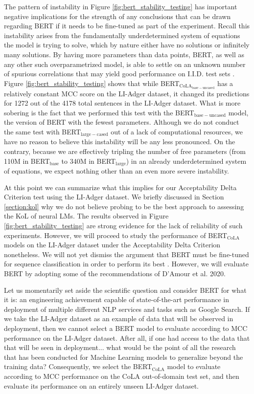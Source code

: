 The pattern of instability in Figure \ref{fig:bert_stability_testing} has important negative implications for the strength of any conclusions that can be drawn regarding BERT if it needs to be fine-tuned as part of the experiment.  Recall this instability arises from the fundamentally underdetermined system of equations the model is trying to solve, which by nature either have no solutions or infinitely many solutions.  By having more parameters than data points, BERT, as well as any other such overparametrized model, is able to settle on an unknown number of spurious correlations that may yield good performance on I.I.D. test sets \citep{d2020underspecification}.  Figure \ref{fig:bert_stability_testing} shows that while BERT$_\mathrm{CoLA_{base-uncased}}$ has a relatively constant MCC score on the LI-Adger dataset, it changed its predictions for 1272 out of the 4178 total sentences in the LI-Adger dataset.  What is more sobering is the fact that we performed this test with the BERT$_{\mathrm{base-uncased}}$ model, the version of BERT with the fewest parameters.  Although we do not conduct the same test with BERT$_{\mathrm{large-cased}}$ out of a lack of computational resources, we have no reason to believe this instability will be any less pronounced.  On the contrary, because we are effectively tripling the number of free parameters (from 110M in BERT$_{\mathrm{base}}$ to 340M in BERT$_{\mathrm{large}}$) in an already underdetermined system of equations, we expect nothing other than an even more severe instability.

At this point we can summarize what this implies for our Acceptability Delta Criterion test using the LI-Adger dataset.  We briefly discussed in Section \ref{section:kol} why we do not believe probing to be the best approach to assessing the KoL of neural LMs.  The results observed in Figure \ref{fig:bert_stability_testing} are strong evidence for the lack of reliability of such experiments.  However, we will proceed to study the performance of BERT$_\mathrm{CoLA}$ models on the LI-Adger dataset under the Acceptability Delta Criterion nonetheless.  We will not yet dismiss the argument that BERT must be fine-tuned for sequence classification in order to perform its best \citep{sun2019}.  However, we will evaluate BERT by adopting some of the recommendations of D'Amour et al. 2020.

Let us momentarily set aside the scientific question and consider BERT for what it is: an engineering achievement capable of state-of-the-art performance in deployment of multiple different NLP services and tasks such as Google Search.  If we take the LI-Adger dataset as an example of data that will be observed in deployment, then we cannot select a BERT model to evaluate according to MCC performance on the LI-Adger dataset.  After all, if one had access to the data that that will be seen in deployment... what would be the point of all the research that has been conducted for Machine Learning models to generalize beyond the training data?  Consequently, we select the BERT$_\mathrm{CoLA}$ model to evaluate according to MCC performance on the CoLA out-of-domain test set, and then evaluate its performance on an entirely unseen LI-Adger dataset.

